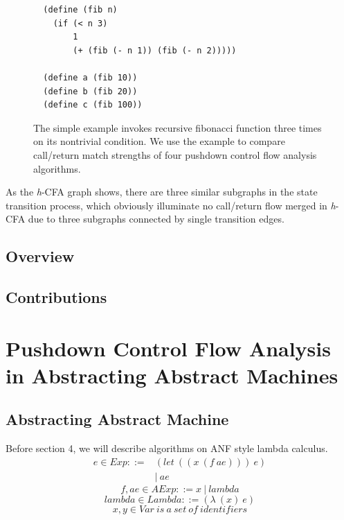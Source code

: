 \documentclass{article}
\begin{document}
\begin{figure}
  \small
  \lstset{language=Lisp}
  \begin{lstlisting}
  (define (fib n)
    (if (< n 3)
        1
        (+ (fib (- n 1)) (fib (- n 2)))))

  (define a (fib 10))
  (define b (fib 20))
  (define c (fib 100))
  \end{lstlisting}
\caption{
The simple example invokes recursive fibonacci function three times on its nontrivial condition.
We use the example to compare call/return match strengths of four pushdown control flow analysis algorithms.
}
\label{fig:fib}
\end{figure}

As the \textit{h}-CFA graph shows, there are three similar subgraphs in the state transition process, which obviously illuminate no call/return flow merged in \textit{h}-CFA due to three subgraphs connected by single transition edges.

\subsection{Overview}
\label{sub:Overview}


\subsection{Contributions}
\label{sub:Contributions}

\section{Pushdown Control Flow Analysis in Abstracting Abstract Machines}
\label{sec:Pushdown Control Flow Analysis in Abstracting Abstract Machines}
\subsection{Abstracting Abstract Machine}
\label{subs:Abstracting Abstract Machine}
Before section 4, we will describe algorithms on ANF style lambda calculus.
\[
\begin{aligned}
\label{eq:bnf}
e \in Exp ::= {}& (let\ ((x\ (f\ ae)))\ e) {} \\
&|\ ae
\end{aligned}
\]
\[
\tag{atomic expressions}
f, ae \in AExp ::= x\ |\ lambda
\]
\[
\tag{lambda abstractions}
lambda \in Lambda ::= (\lambda\ (x)\ e)
\]
\[
\tag{variables}
x,y \in Var \ is\ a\ set\ of\ identifiers
\]
\end{document}
